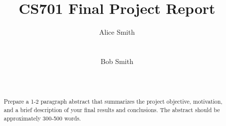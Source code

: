 \documentclass{sig-alternate-05-2015}
\begin{document}
\title{CS701 Final Project Report}


\author{
%
\alignauthor
Alice Smith\\
       \\
       \\
\alignauthor
Bob Smith\\
       \\
       \\
}

\maketitle

\begin{abstract}

	Prepare a 1-2 paragraph abstract that summarizes the project objective,
	motivation, and a brief description of your final results and conclusions.
	The abstract should be approximately 300-500 words.

\end{abstract}



















\end{document}
